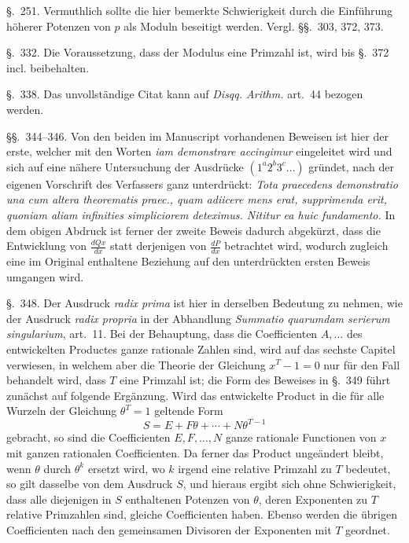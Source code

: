 \documentclass[12pt]{article}
\begin{document}
\S.~251. Vermuthlich sollte die hier bemerkte Schwierigkeit durch die Einführung höherer Potenzen von $p$ als Moduln beseitigt werden. Vergl. \S\S.~303, 372, 373.

\S.~332. Die Voraussetzung, dass der Modulus eine Primzahl ist, wird bis \S.~372 incl. beibehalten.

\S.~338. Das unvollständige Citat kann auf \textit{Disqq. Arithm.} art.~44 bezogen werden.

\S\S.~344--346. Von den beiden im Manuscript vorhandenen Beweisen ist hier der erste, welcher mit den Worten \textit{iam demonstrare accingimur} eingeleitet wird und sich auf eine nähere Untersuchung der Ausdrücke $(1^a2^b3^c\ldots)$ gründet, nach der eigenen Vorschrift des Verfassers ganz unterdrückt: \textit{Tota praecedens demonstratio una cum altera theorematis praec., quam adiicere mens erat, supprimenda erit, quoniam aliam infinities simpliciorem deteximus. Nititur ea huic fundamento.} In dem obigen Abdruck ist ferner der zweite Beweis dadurch abgekürzt, dass die Entwicklung von $\frac{dQx}{dx}$ statt derjenigen von $\frac{dP}{dx}$ betrachtet wird, wodurch zugleich eine im Original enthaltene Beziehung auf den unterdrückten ersten Beweis umgangen wird.

\S.~348. Der Ausdruck \textit{radix prima} ist hier in derselben Bedeutung zu nehmen, wie der Ausdruck \textit{radix propria} in der Abhandlung \textit{Summatio quarumdam serierum singularium}, art.~11. Bei der Behauptung, dass die Coefficienten $A,\ldots$ des entwickelten Productes ganze rationale Zahlen sind, wird auf das sechste Capitel verwiesen, in welchem aber die Theorie der Gleichung $x^T-1=0$ nur für den Fall behandelt wird, dass $T$ eine Primzahl ist; die Form des Beweises in \S.~349 führt zunächst auf folgende Ergänzung. Wird das entwickelte Product in die für alle Wurzeln der Gleichung $\theta^T=1$ geltende Form
\[
S=E+F\theta+\cdots+N\theta^{T-1}
\]
gebracht, so sind die Coefficienten $E,F,\ldots,N$ ganze rationale Functionen von $x$ mit ganzen rationalen Coefficienten. Da ferner das Product ungeändert bleibt, wenn $\theta$ durch $\theta^k$ ersetzt wird, wo $k$ irgend eine relative Primzahl zu $T$ bedeutet, so gilt dasselbe von dem Ausdruck $S$, und hieraus ergibt sich ohne Schwierigkeit, dass alle diejenigen in $S$ enthaltenen Potenzen von $\theta$, deren Exponenten zu $T$ relative Primzahlen sind, gleiche Coefficienten haben. Ebenso werden die übrigen Coefficienten nach den gemeinsamen Divisoren der Exponenten mit $T$ geordnet.
\end{document}
